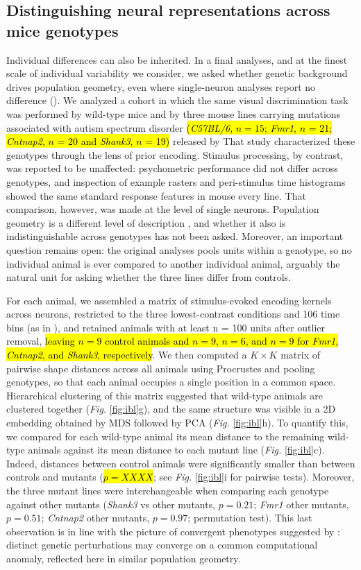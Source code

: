\subsection{Distinguishing neural representations across mice genotypes}
Individual differences can also be inherited. In a final analyses, and at the finest scale of individual variability we consider, we asked whether genetic background drives population geometry, even where single-neuron analyses report no difference (\cite{noel2025}). We analyzed a cohort in which the same visual discrimination task was performed by
wild-type mice and by three mouse lines carrying mutations associated with autism
spectrum disorder \hl{(\textit{C57BL/6}, $n=15$; \textit{Fmr1}, $n$ = 21; \textit{Cntnap2}, $n$ = 20 and \textit{Shank3}, $n$ = 19)} released by
\cite{noel2025}
That study characterized these genotypes through the lens of prior encoding. Stimulus processing, by contrast, was reported to be unaffected: psychometric performance did not differ across genotypes, and inspection of example rasters and peri-stimulus time histograms showed the same standard response features in mouse every line.
That comparison, however, was made at the level of single neurons. Population geometry is a different level of description \parencite{Kriegeskorte2021}, and whether it also is indistinguishable across genotypes has not been asked. Moreover, an important question remains open: the original analyses pools units within a genotype, so no individual animal is ever compared to another individual animal, arguably the natural unit for asking whether the three lines differ from controls.

For each animal, we assembled a matrix of stimulus-evoked encoding kernels across neurons, restricted to the three lowest-contrast conditions and 106 time bins (as in \cite{noel2025}), and retained animals with at least n = 100 units after outlier removal, \hl{leaving $n=9$ control animals and $n=9$, $n=6$, and $n=9$ for \textit{Fmr1}, \textit{Cntnap2}, and \textit{Shank3}, respectively}. We then computed a $K \times K$ matrix of pairwise shape distances across all animals using Procrustes and pooling genotypes, so that each animal occupies a single position in a common space. Hierarchical clustering of this matrix suggested that wild-type animals are clustered together (\textit{Fig.} \ref{fig:ibl}g), and the same structure was visible in a 2D embedding obtained by MDS followed by PCA (\textit{Fig.} \ref{fig:ibl}h). To quantify this, we compared for each wild-type animal its mean distance to the remaining wild-type animals against its mean distance to each mutant line (\textit{Fig.} \ref{fig:ibl}c). Indeed, distances between control animals were significantly smaller than between controls and mutants (\hl{$p= XXXX$}; see \textit{Fig.} \ref{fig:ibl}i for pairwise tests). Moreover, the three mutant lines were interchangeable when comparing each genotype against other mutants (\textit{Shank3} vs other mutants, $p=0.21$; \textit{Fmr1} other mutants, $p=0.51$; \textit{Cntnap2} other mutants, $p=0.97$; permutation test). This last observation is in line with the picture of convergent phenotypes suggested by \cite{noel2025}: distinct genetic perturbations may converge on a common computational anomaly, reflected here in similar population geometry.

